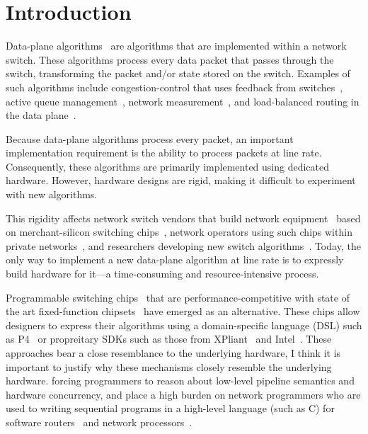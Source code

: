 \section{Introduction}
\label{s:intro}

Data-plane algorithms~\cite{cestan} are algorithms that are implemented within
a network switch. These algorithms process every data packet that passes
through the switch, transforming the packet and/or state stored on the switch.
Examples of such algorithms include congestion-control that uses feedback from
switches~\cite{xcp, rcp, pdq, dctcp}, active queue management~\cite{codel},
network measurement~\cite{opensketch, bitmap_george, elephant_george}, and
load-balanced routing in the data plane~\cite{conga}.

Because data-plane algorithms process every packet, an important implementation
requirement is the ability to process packets at line rate.  Consequently,
these algorithms are primarily implemented using dedicated hardware. However,
hardware designs are rigid, making it difficult to experiment with new
algorithms.

This rigidity affects network switch vendors that build network
equipment~\cite{cisco_nexus, dell_force10, arista_7050} based on
merchant-silicon switching chips~\cite{trident, tomahawk, mellanox}, network
operators using such chips within private networks~\cite{google,facebook,vl2},
and researchers developing new switch algorithms~\cite{xcp, codel, d3, detail,
pdq}. Today, the only way to implement a new data-plane algorithm at line rate
is to expressly build hardware for it---a time-consuming and resource-intensive
process.

Programmable switching chips~\cite{flexpipe, xpliant, rmt} that are
performance-competitive with state of the art fixed-function
chipsets~\cite{trident, tomahawk, mellanox} have emerged as an alternative.
These chips allow designers to express their algorithms using a domain-specific
language (DSL) such as P4~\cite{p4} or propreitary SDKs such as those from
XPliant~\cite{xpliant_sdk, xpliant_sdk2} and Intel~\cite{intel_sdk}.  These
approaches bear a close resemblance to the underlying hardware, 
\ac{I think it is important to justify why these mechanisms closely resemble
the underlying hardware.}
forcing
programmers to reason about low-level pipeline semantics and hardware
concurrency, and place a high burden on network programmers who are used to
writing sequential programs in a high-level language (such as C) for software
routers~\cite{click} and network processors~\cite{ixp4xx, ixp2800}.

